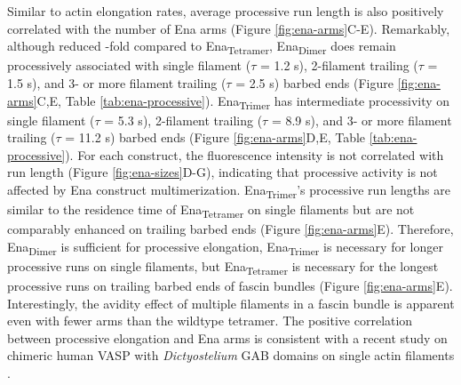 Similar to actin elongation rates, average processive run length is also positively correlated with the number of Ena arms (Figure \ref{fig:ena-arms}C-E). Remarkably, although reduced -fold compared to Ena\textsubscript{Tetramer}, Ena\textsubscript{Dimer} does remain processively associated with single filament ($\tau$ = 1.2 s), 2-filament trailing ($\tau$ = 1.5 s), and 3- or more filament trailing ($\tau$ = 2.5 s) barbed ends (Figure \ref{fig:ena-arms}C,E, Table \ref{tab:ena-processive}). Ena\textsubscript{Trimer} has intermediate processivity on single filament ($\tau$ = 5.3 s), 2-filament trailing ($\tau$ = 8.9 s), and 3- or more filament trailing ($\tau$ = 11.2 s) barbed ends (Figure \ref{fig:ena-arms}D,E, Table \ref{tab:ena-processive}). For each construct, the fluorescence intensity is not correlated with run length (Figure \ref{fig:ena-sizes}D-G), indicating that processive activity is not affected by Ena construct multimerization. Ena\textsubscript{Trimer}'s processive run lengths are similar to the residence time of Ena\textsubscript{Tetramer} on single filaments but are not comparably enhanced on trailing barbed ends (Figure \ref{fig:ena-arms}E). Therefore, Ena\textsubscript{Dimer} is sufficient for processive elongation, Ena\textsubscript{Trimer} is necessary for longer processive runs on single filaments, but Ena\textsubscript{Tetramer} is necessary for the longest processive runs on trailing barbed ends of fascin bundles (Figure \ref{fig:ena-arms}E). Interestingly, the avidity effect of multiple filaments in a fascin bundle is apparent even with fewer arms than the wildtype tetramer. The positive correlation between processive elongation and Ena arms is consistent with a recent study on chimeric human VASP with \textit{Dictyostelium} GAB domains on single actin filaments \citep{bruhmann_distinct_2017}. 

